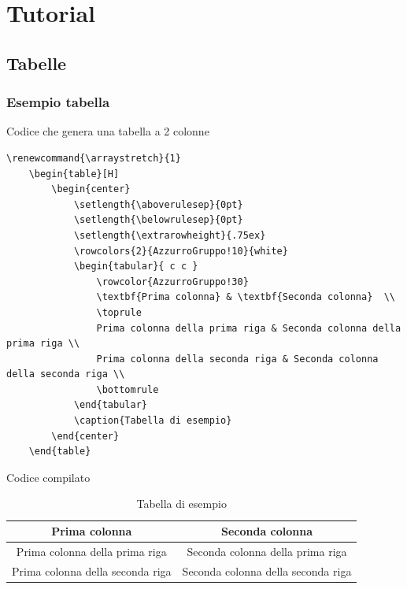 \section{Tutorial}
\subsection{Tabelle}
\subsubsection{Esempio tabella}
Codice che genera una tabella a 2 colonne
\begin{lstlisting}
\renewcommand{\arraystretch}{1}
	\begin{table}[H]
		\begin{center}
			\setlength{\aboverulesep}{0pt}
			\setlength{\belowrulesep}{0pt}
			\setlength{\extrarowheight}{.75ex}
			\rowcolors{2}{AzzurroGruppo!10}{white}
			\begin{tabular}{ c c }
				\rowcolor{AzzurroGruppo!30} 
				\textbf{Prima colonna} & \textbf{Seconda colonna}  \\
				\toprule
				Prima colonna della prima riga & Seconda colonna della prima riga \\
				Prima colonna della seconda riga & Seconda colonna della seconda riga \\
				\bottomrule
			\end{tabular}
			\caption{Tabella di esempio}
		\end{center}
	\end{table}
\end{lstlisting}
Codice compilato
\renewcommand{\arraystretch}{1}
	\begin{table}[H]
		\begin{center}
			\setlength{\aboverulesep}{0pt}
			\setlength{\belowrulesep}{0pt}
			\setlength{\extrarowheight}{.75ex}
			\begin{tabular}{ c c }
				\rowcolor{AzzurroGruppo!30} 
				\textbf{Prima colonna} & \textbf{Seconda colonna}  \\
				\toprule
				Prima colonna della prima riga & Seconda colonna della prima riga \\
				Prima colonna della seconda riga & Seconda colonna della seconda riga \\
				\bottomrule
			\end{tabular}
			\caption{Tabella di esempio}
		\end{center}
	\end{table}

